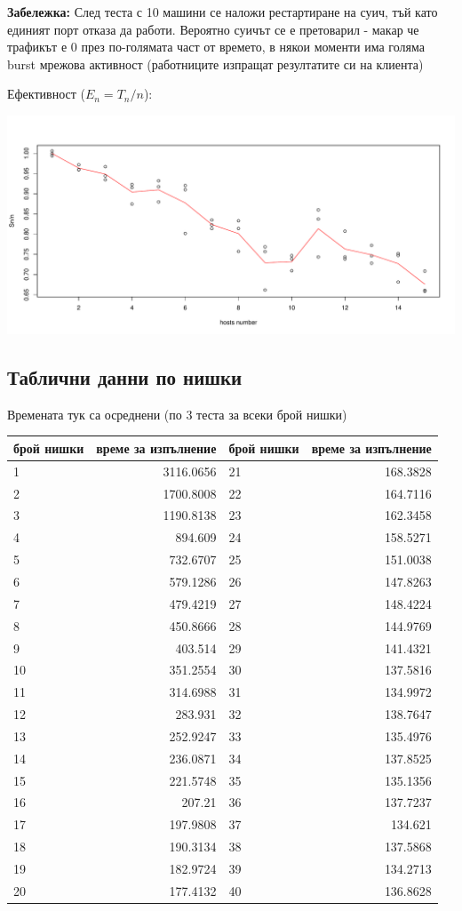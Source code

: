 \documentclass[12pt]{extarticle}
\begin{document}
\textbf{Забележка:} След теста с 10 машини се наложи рестартиране
на суич, тъй като единият порт отказа да работи. Вероятно суичът
се е претоварил - макар че трафикът е 0 през по-голямата част
от времето, в някои моменти има голяма burst мрежова активност
(работниците изпращат резултатите си на клиента)

\pagebreak
Ефективност ($E_n = T_n / n$):
\begin{center}
\includegraphics[width=\textwidth]{host_graphs/Sn_n.pdf}
\end{center}

\subsection{Таблични данни по нишки}
Времената тук са осреднени (по 3 теста за всеки брой нишки)
\scriptsize
\begin{center}
\begin{tabular}{ | l r | l r | }
\hline
брой нишки & време за изпълнение & брой нишки & време за изпълнение\\
\hline
 1 & 3116.0656 & 21 & 168.3828 \\
 2 & 1700.8008 & 22 & 164.7116 \\
 3 & 1190.8138 & 23 & 162.3458 \\
 4 & 894.609   & 24 & 158.5271 \\
 5 & 732.6707  & 25 & 151.0038 \\
 6 & 579.1286  & 26 & 147.8263 \\
 7 & 479.4219  & 27 & 148.4224 \\
 8 & 450.8666  & 28 & 144.9769 \\
 9 & 403.514   & 29 & 141.4321 \\
10 & 351.2554  & 30 & 137.5816 \\
11 & 314.6988  & 31 & 134.9972 \\
12 & 283.931   & 32 & 138.7647 \\
13 & 252.9247  & 33 & 135.4976 \\
14 & 236.0871  & 34 & 137.8525 \\
15 & 221.5748  & 35 & 135.1356 \\
16 & 207.21    & 36 & 137.7237 \\
17 & 197.9808  & 37 & 134.621 \\
18 & 190.3134  & 38 & 137.5868 \\
19 & 182.9724  & 39 & 134.2713 \\
20 & 177.4132  & 40 & 136.8628 \\
\hline
\end{tabular}
\end{center}
\end{document}
